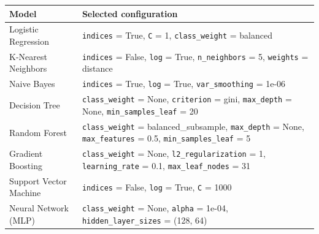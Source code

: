 \begin{tabular}{>{\raggedright\arraybackslash}l>{\raggedright\arraybackslash}p{10.5cm}}
\toprule
Model & Selected configuration \\
\midrule
Logistic Regression & \texttt{indices} = True, \texttt{C} = 1, \texttt{class\_weight} = balanced \\
K-Nearest Neighbors & \texttt{indices} = False, \texttt{log} = True, \texttt{n\_neighbors} = 5, \texttt{weights} = distance \\
Naive Bayes & \texttt{indices} = True, \texttt{log} = True, \texttt{var\_smoothing} = 1e-06 \\
Decision Tree & \texttt{class\_weight} = None, \texttt{criterion} = gini, \texttt{max\_depth} = None, \texttt{min\_samples\_leaf} = 20 \\
Random Forest & \texttt{class\_weight} = balanced\_subsample, \texttt{max\_depth} = None, \texttt{max\_features} = 0.5, \texttt{min\_samples\_leaf} = 5 \\
Gradient Boosting & \texttt{class\_weight} = None, \texttt{l2\_regularization} = 1, \texttt{learning\_rate} = 0.1, \texttt{max\_leaf\_nodes} = 31 \\
Support Vector Machine & \texttt{indices} = False, \texttt{log} = True, \texttt{C} = 1000 \\
Neural Network (MLP) & \texttt{class\_weight} = None, \texttt{alpha} = 1e-04, \texttt{hidden\_layer\_sizes} = (128, 64) \\
\bottomrule
\end{tabular}
